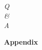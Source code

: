 \documentclass{beamer}
\begin{document}
\begin{frame}{}
   \centering
   \begin{minipage}{0.75\textwidth} %
      \Huge   
      \raggedright \emph{Q} \\   
      \centering \emph{\&} \\   
      \raggedleft \emph{A} \\ 
   \end{minipage}
\end{frame}

\begin{frame}[plain,c]
    \begin{center}
        {\Huge\bfseries Appendix}
    \end{center}
\end{frame}
\end{document}
